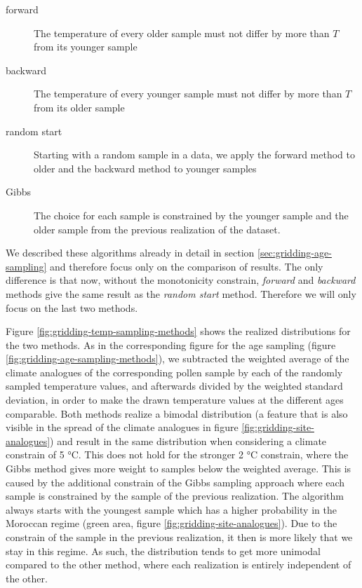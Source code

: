 \begin{refsection}
\begin{description}
	\item[forward] The temperature of every older sample must not differ by more than $T$ from its younger sample
	\item[backward] The temperature of every younger sample must not differ by more than $T$ from its older sample
	\item[random start] Starting with a random sample in a data, we apply the forward method to older and the backward method to younger samples
	\item[Gibbs] The choice for each sample is constrained by the younger sample and the older sample from the previous realization of the dataset.
\end{description}

We described these algorithms already in detail in section \ref{sec:gridding-age-sampling} and therefore focus only on the comparison of results. The only difference is that now, without the monotonicity constrain, \textit{forward} and \textit{backward} methods give the same result as the \textit{random start} method. Therefore we will only focus on the last two methods.

Figure \ref{fig:gridding-temp-sampling-methods} shows the realized distributions for the two methods. As in the corresponding figure for the age sampling (figure \ref{fig:gridding-age-sampling-methods}), we subtracted the weighted average of the climate analogues of the corresponding pollen sample by each of the randomly sampled temperature values, and afterwards divided by the weighted standard deviation, in order to make the drawn temperature values at the different ages comparable. Both methods realize a bimodal distribution (a feature that is also visible in the spread of the climate analogues in figure \ref{fig:gridding-site-analogues}) and result in the same distribution when considering a climate constrain of 5 °C. This does not hold for the stronger 2 °C constrain, where the Gibbs method gives more weight to samples below the weighted average. This is caused by the additional constrain of the Gibbs sampling approach where each sample is constrained by the sample of the previous realization. The algorithm always starts with the youngest sample which has a higher probability in the Moroccan regime (green area, figure \ref{fig:gridding-site-analogues}). Due to the constrain of the sample in the previous realization, it then is more likely that we stay in this regime. As such, the distribution tends to get more unimodal compared to the other method, where each realization is entirely independent of the other.


\end{refsection}
